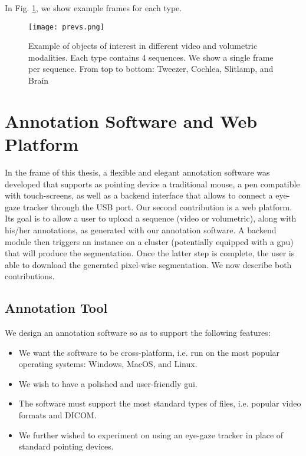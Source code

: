 In Fig. \ref{fig:dset_previews}, we show example frames for each type.

\begin{figure}
\centering
\texttt{[image: prevs.png]}
\caption{Example of objects of interest in different video and volumetric modalities. Each type contains 4 sequences. We show a single frame per sequence.
  From top to bottom: Tweezer, Cochlea, Slitlamp, and Brain}
\label{fig:dset_previews}
\end{figure}


\section{Annotation Software and Web Platform}
In the frame of this thesis, a flexible and elegant annotation software was developed that supports as pointing device a traditional mouse, a pen compatible with touch-screens, as well as a backend interface that allows to connect a eye-gaze tracker through the USB port.
Our second contribution is a web platform.
Its goal is to allow a user to upload a sequence (video or volumetric), along with his/her annotations, as generated with our annotation software.
A backend module then triggers an instance on a cluster (potentially equipped with a \gls{gpu}) that will produce the segmentation.
Once the latter step is complete, the user is able to download the generated pixel-wise segmentation.
We now describe both contributions.

\subsection{Annotation Tool}
\label{sec:anna}

We design an annotation software so as to support the following features:

\begin{itemize}
    \item We want the software to be cross-platform, i.e. run on the most popular operating systems: Windows, MacOS, and Linux.
    \item We wish to have a polished and user-friendly \gls{gui}.
    \item The software must support the most standard types of files, i.e. popular video formats and DICOM.
    \item We further wished to experiment on using an eye-gaze tracker in place of standard pointing devices.
\end{itemize}

